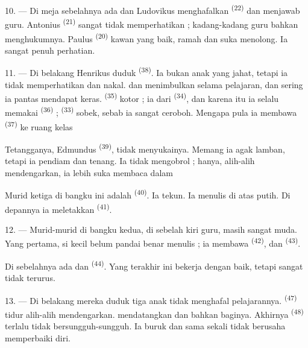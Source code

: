10. --- Di meja sebelahnya ada  
dan  Ludovikus menghafalkan 
\textsuperscript{(22)} dan menjawab 
guru. Antonius \textsuperscript{(21)} sangat tidak memperhatikan ;
kadang-kadang guru bahkan menghukumnya. Paulus
\textsuperscript{(20)} kawan yang baik, ramah dan suka menolong. Ia
sangat penuh perhatian.

\VUsaut{4.2mm}
\VUsaut{3.2mm}

11. --- Di belakang Henrikus duduk 
\textsuperscript{(38)}. Ia bukan anak yang jahat, tetapi ia
 tidak memperhatikan dan nakal.
 dan  menimbulkan
 selama pelajaran, dan sering ia pantas mendapat
 keras.  \textsuperscript{(35)}
kotor ; ia  dari 
\textsuperscript{(34)}, dan karena itu ia selalu memakai  \textsuperscript{(36)} ; 
\textsuperscript{(33)} sobek, sebab ia sangat ceroboh. Mengapa pula ia
membawa  \textsuperscript{(37)} ke ruang kelas

Tetangganya, Edmundus \textsuperscript{(39)}, tidak menyukainya.
Memang ia agak lamban, tetapi ia pendiam dan tenang. Ia tidak
mengobrol ; hanya, alih-alih mendengarkan, ia lebih suka membaca
 dalam 

Murid ketiga di bangku ini adalah 
\textsuperscript{(40)}. Ia tekun. Ia menulis di atas  putih. Di depannya ia meletakkan 
\textsuperscript{(41)}.

12. --- Murid-murid di bangku kedua, di sebelah kiri guru, masih
sangat muda. Yang pertama, si kecil  belum pandai
benar menulis ; ia membawa  \textsuperscript{(42)},
 dan  \textsuperscript{(43)}.

Di sebelahnya ada  dan 
\textsuperscript{(44)}. Yang terakhir ini bekerja dengan baik, tetapi
 sangat tidak terurus.

13. --- Di belakang mereka duduk tiga anak  tidak menghafal pelajarannya. 
\textsuperscript{(47)} tidur alih-alih mendengarkan.
 mendatangkan  dan bahkan
 baginya. Akhirnya 
\textsuperscript{(48)} terlalu tidak bersungguh-sungguh. Ia
 buruk dan sama sekali tidak berusaha
memperbaiki diri.

